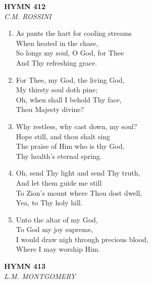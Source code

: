 \documentclass[11pt,a4paper]{article}
\begin{document}
\newpage
\begin{center}
    {\Large \textbf{HYMN 412}}
    \\
    \textit{C.M. ROSSINI}
\end{center}
\vspace{1em}

\begin{enumerate}
    \item As pants the hart for cooling streams \\
        When heated in the chase, \\
        So longs my soul, O God, for Thee \\
        And Thy refreshing grace.

    \item For Thee, my God, the living God, \\
        My thirsty soul doth pine; \\
        Oh, when shall I behold Thy face, \\
        Thou Majesty divine?

    \item Why restless, why cast down, my soul? \\
        Hope still, and thou shalt sing \\
        The praise of Him who is thy God, \\
        Thy health's eternal spring.

    \item Oh, send Thy light and send Thy truth, \\
        And let them guide me still \\
        To Zion's mount where Thou dost dwell, \\
        Yea, to Thy holy hill.

    \item Unto the altar of my God, \\
        To God my joy supreme, \\
        I would draw nigh through precious blood, \\
        Where I may worship Him.

\end{enumerate}

\newpage
\begin{center}
    {\Large \textbf{HYMN 413}}
    \\
    \textit{L.M. MONTGOMERY}
\end{center}
\vspace{1em}
\end{document}
